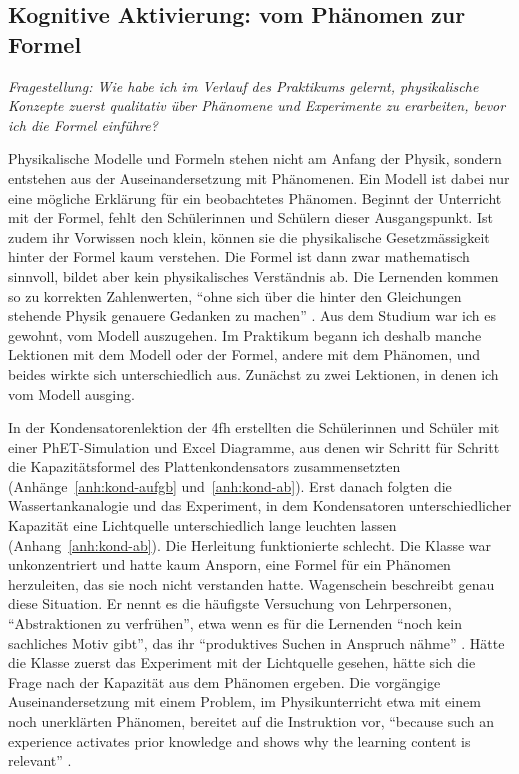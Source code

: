 \documentclass[12pt,a4paper]{article}
\begin{document}
\subsection{Kognitive Aktivierung: vom Phänomen zur Formel}
\label{sec:schwerpunkt1}

\noindent\textit{Fragestellung: Wie habe ich im Verlauf des Praktikums gelernt,
physikalische Konzepte zuerst qualitativ über Phänomene und Experimente zu
erarbeiten, bevor ich die Formel einführe?}

Physikalische Modelle und Formeln stehen nicht am Anfang der Physik, sondern
entstehen aus der Auseinandersetzung mit Phänomenen. Ein Modell ist dabei
nur eine mögliche Erklärung für ein beobachtetes Phänomen. Beginnt der
Unterricht mit der Formel, fehlt den Schülerinnen und Schülern dieser
Ausgangspunkt. Ist zudem ihr Vorwissen noch klein, können sie die
physikalische Gesetzmässigkeit hinter der Formel kaum verstehen. Die Formel
ist dann zwar mathematisch sinnvoll, bildet aber kein physikalisches
Verständnis ab. Die Lernenden kommen so zu korrekten Zahlenwerten,
\enquote{ohne sich über die hinter den Gleichungen stehende Physik genauere
Gedanken zu machen} \parencite[5]{scheckerduit2018}. Aus dem Studium war ich es gewohnt, vom Modell auszugehen.
Im Praktikum begann ich deshalb manche Lektionen mit dem Modell oder der
Formel, andere mit dem Phänomen, und beides wirkte sich unterschiedlich aus.
Zunächst zu zwei Lektionen, in denen ich vom Modell ausging.

In der Kondensatorenlektion der 4fh erstellten die Schülerinnen und Schüler mit
einer PhET-Simulation und Excel Diagramme, aus denen wir Schritt für Schritt
die Kapazitätsformel des Plattenkondensators zusammensetzten
(Anhänge~\ref{anh:kond-aufgb} und~\ref{anh:kond-ab}). Erst danach folgten die Wassertankanalogie und
das Experiment, in dem Kondensatoren unterschiedlicher Kapazität eine
Lichtquelle unterschiedlich lange leuchten lassen (Anhang~\ref{anh:kond-ab}).
Die Herleitung funktionierte schlecht. Die Klasse war unkonzentriert und hatte
kaum Ansporn, eine Formel für ein Phänomen herzuleiten, das sie noch nicht
verstanden hatte. Wagenschein beschreibt genau diese Situation. Er nennt es die
häufigste Versuchung von Lehrpersonen, \enquote{Abstraktionen zu verfrühen},
etwa wenn es für die Lernenden \enquote{noch kein sachliches Motiv gibt}, das
ihr \enquote{produktives Suchen in Anspruch nähme}
\parencite[98--99]{wagenschein2013}. Hätte die Klasse zuerst das Experiment mit
der Lichtquelle gesehen, hätte sich die Frage nach der Kapazität aus dem
Phänomen ergeben. Die vorgängige Auseinandersetzung mit einem Problem, im
Physikunterricht etwa mit einem noch unerklärten Phänomen, bereitet auf die
Instruktion vor, \enquote{because such an experience activates prior knowledge
and shows why the learning content is relevant} \parencite[8]{dejong2023}.
\end{document}
